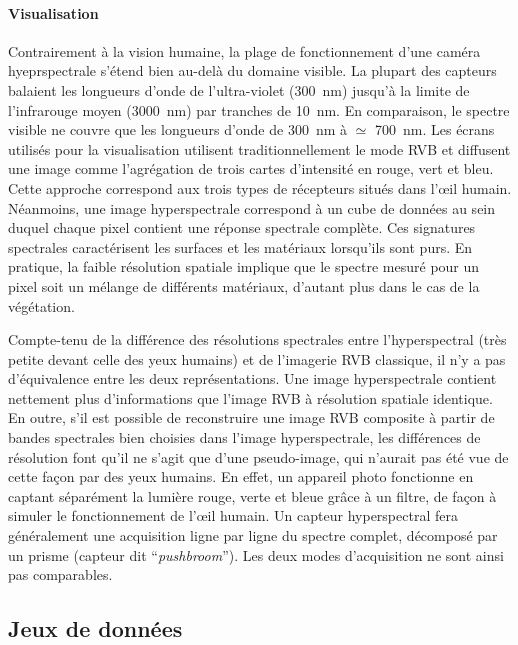 \paragraph{Visualisation}
Contrairement à la vision humaine, la plage de fonctionnement d'une caméra hyeprspectrale s'étend bien au-delà du domaine visible. La plupart des capteurs balaient les longueurs d'onde de l'ultra-violet (\SI{300}{\nano\meter}) jusqu'à la limite de l'infrarouge moyen (\SI{3 000}{\nano\meter}) par tranches de \SI{10}{\nano\meter}. En comparaison, le spectre visible ne couvre que les longueurs d'onde de \SI{300}{\nano\meter} à $\simeq$ \SI{700}{\nano\meter}. Les écrans utilisés pour la visualisation utilisent traditionnellement le mode \gls{RVB} et diffusent une image comme l'agrégation de trois cartes d'intensité en rouge, vert et bleu. Cette approche correspond aux trois types de récepteurs situés dans l'\oe{}il humain. Néanmoins, une image hyperspectrale correspond à un cube de données au sein duquel chaque pixel contient une réponse spectrale complète. Ces signatures spectrales caractérisent les surfaces et les matériaux lorsqu'ils sont purs. En pratique, la faible résolution spatiale implique que le spectre mesuré pour un pixel soit un mélange de différents matériaux, d'autant plus dans le cas de la végétation.

Compte-tenu de la différence des résolutions spectrales entre l'hyperspectral (très petite devant celle des yeux humains) et de l'imagerie \gls{RVB} classique, il n'y a pas d'équivalence entre les deux représentations. Une image hyperspectrale contient nettement plus d'informations que l'image \gls{RVB} à résolution spatiale identique. En outre, s'il est possible de reconstruire une image \gls{RVB} composite à partir de bandes spectrales bien choisies dans l'image hyperspectrale, les différences de résolution font qu'il ne s'agit que d'une pseudo-image, qui n'aurait pas été vue de cette façon par des yeux humains. En effet, un appareil photo fonctionne en captant séparément la lumière rouge, verte et bleue grâce à un filtre, de façon à simuler le fonctionnement de l'\oe{}il humain. Un capteur hyperspectral fera généralement une acquisition ligne par ligne du spectre complet, décomposé par un prisme (capteur dit ``\textit{pushbroom}''). Les deux modes d'acquisition ne sont ainsi pas comparables.

\subsection{Jeux de données}
\label{sec:hyperspectral_datasets}

